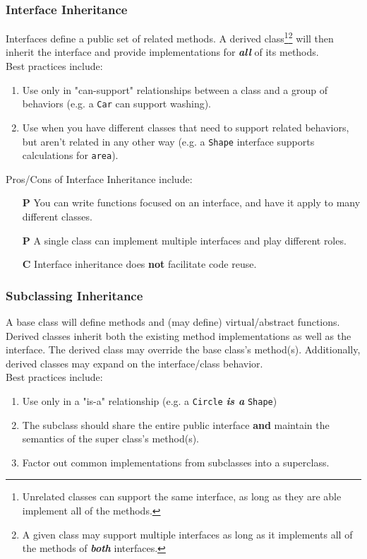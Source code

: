 \documentclass{article}
\begin{document}
\subsubsection{Interface Inheritance}
Interfaces define a public set of related methods. A derived
class\footnote{Unrelated classes can support the same interface, as
  long as they are able implement all of the methods.}\footnote{A
  given class may support multiple interfaces as long as it implements
  all of the methods of \textit{\textbf{both}} interfaces.} will then
inherit the interface and provide implementations for
\textit{\textbf{all}} of its methods. \\ 
Best practices include:
\begin{enumerate}[label=(\roman*)]
\item Use only in "can-support" relationships between a class and a
  group of behaviors (e.g. a \texttt{Car} can support washing).
\item Use when you have different classes that need to support related
  behaviors, but aren't related in any other way
  (e.g. a \texttt{Shape} interface supports calculations for
  \texttt{area}).
\end{enumerate}

Pros/Cons of Interface Inheritance include:
\begin{enumerate}
\item [\textbf{P}] You can write functions focused on an interface, and have it
  apply to many different classes.
\item [\textbf{P}] A single class can implement multiple interfaces and play
  different roles.
\item [\textbf{C}] Interface inheritance does \textbf{not} facilitate code reuse.
\end{enumerate}

\subsubsection{Subclassing Inheritance}
A base class will define methods and (may define) virtual/abstract
functions. Derived classes inherit both the existing method
implementations as well as the interface. The derived class may
override the base class's method(s). Additionally, derived classes may
expand on the interface/class behavior. \\
Best practices include:
\begin{enumerate}[label=(\roman*)]
\item Use only in a "is-a" relationship (e.g. a \texttt{Circle}
  \textit{\textbf{is a}} \texttt{Shape})
\item The subclass should share the entire public interface
  \textbf{and} maintain the semantics of the super class's method(s).
\item Factor out common implementations from subclasses into a superclass.
\end{enumerate}
\end{document}
